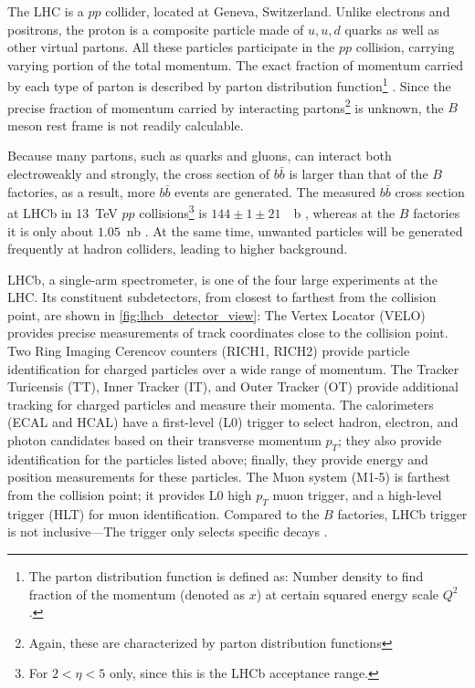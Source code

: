 The LHC is a $pp$ collider, located at Geneva, Switzerland.
Unlike electrons and positrons, the proton is a composite particle made of
$u, u, d$ quarks as well as other virtual partons.
All these particles participate in the $pp$ collision, carrying
varying portion of the total momentum.
The exact fraction of momentum carried by each type of parton is described by
parton distribution function\footnote{
    The parton distribution function is defined as:
    Number density to find fraction of the momentum (denoted as $x$) at certain
    squared energy scale $Q^2$.
} \cite{Ball:2014uwa}.
Since the precise fraction of momentum carried by interacting
partons\footnote{
    Again, these are characterized by parton distribution functions
} is unknown, the $B$ meson rest frame is not readily calculable.

Because many partons, such as quarks and gluons, can interact both
electroweakly and strongly,
the cross section of $b \bar{b}$ is larger than that of the $B$ factories, as a
result, more $b \bar{b}$ events are generated.
The measured $b \bar{b}$ cross section at LHCb in \SI{13}{TeV} $pp$
collisions\footnote{
    For $2 < \eta < 5$ only, since this is the LHCb acceptance range.
} is $144 \pm 1 \pm 21$~\si{\mu b} \cite{Aaij:2016avz}, whereas at the $B$
factories it is only about $1.05$~\si{nb} \cite{Harrison:1998yr}.
At the same time, unwanted particles will be generated frequently at hadron
colliders, leading to higher background.


LHCb, a single-arm spectrometer, is one of the four large experiments at the
LHC.
Its constituent subdetectors, from closest to farthest from the collision point,
are shown in \autoref{fig:lhcb_detector_view}:
The Vertex Locator (VELO) provides precise measurements of track coordinates
close to the collision point.
Two Ring Imaging Cerencov counters (RICH1, RICH2) provide particle
identification for charged particles over a wide range of momentum.
The Tracker Turicensis (TT), Inner Tracker (IT), and Outer Tracker (OT) provide
additional tracking for charged particles and measure their momenta.
The calorimeters (ECAL and HCAL) have a first-level (L0) trigger to select
hadron, electron, and photon candidates based on their transverse momentum
$p_T$;
they also provide identification for the particles listed above;
finally, they provide energy and position measurements for these particles.
The Muon system (M1-5) is farthest from the collision point;
it provides L0 high $p_T$ muon trigger, and a high-level trigger (HLT) for muon
identification. Compared to the $B$ factories, LHCb trigger is not
inclusive---The trigger only selects specific decays \cite{LHCb:2008}.

